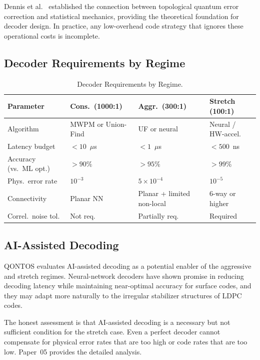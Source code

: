 \documentclass[conference]{IEEEtran}
\begin{document}
Dennis et al.~\cite{dennis2002} established the connection between topological quantum error correction and statistical mechanics, providing the theoretical foundation for decoder design. In practice, any low-overhead code strategy that ignores these operational costs is incomplete.

\subsection{Decoder Requirements by Regime}

\begin{table}[htbp]
\centering
\caption{Decoder Requirements by Regime.}
\label{tab:decoder_reqs}
\begin{tabular}{lp{1.5cm}p{1.5cm}p{1.8cm}}
\toprule
\textbf{Parameter} & \textbf{Cons.\ (1000:1)} & \textbf{Aggr.\ (300:1)} & \textbf{Stretch (100:1)} \\
\midrule
Algorithm & MWPM or Union-Find & UF or neural & Neural / HW-accel. \\
Latency budget & $< 10$~$\mu$s & $< 1$~$\mu$s & $< 500$~ns \\
Accuracy (vs.\ ML opt.) & $> 90\%$ & $> 95\%$ & $> 99\%$ \\
Phys.\ error rate & $10^{-3}$ & $5 \times 10^{-4}$ & $10^{-5}$ \\
Connectivity & Planar NN & Planar + limited non-local & 6-way or higher \\
Correl.\ noise tol. & Not req. & Partially req. & Required \\
\bottomrule
\end{tabular}
\end{table}

\subsection{AI-Assisted Decoding}

QONTOS evaluates AI-assisted decoding as a potential enabler of the aggressive and stretch regimes. Neural-network decoders have shown promise in reducing decoding latency while maintaining near-optimal accuracy for surface codes, and they may adapt more naturally to the irregular stabilizer structures of LDPC codes.

The honest assessment is that AI-assisted decoding is a necessary but not sufficient condition for the stretch case. Even a perfect decoder cannot compensate for physical error rates that are too high or code rates that are too low. Paper~05 provides the detailed analysis.
\end{document}
